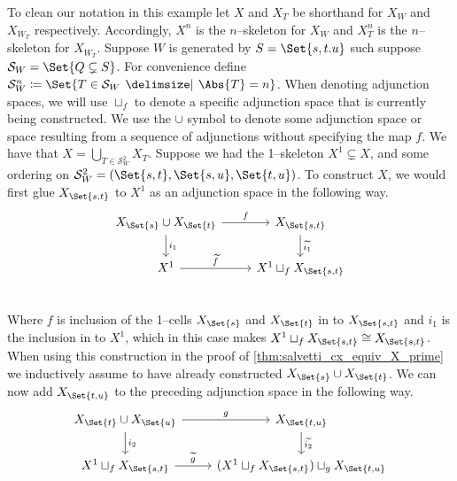 \documentclass[class=article, crop=false]{standalone}
\begin{document}
\begin{example}
    \label{eg:inductive_construction}
    To clean our notation in this example let $X$ and $X_T$ be shorthand for $X_W$ and $X_{W_T}$ respectively. Accordingly, $X^n$ is the $n$--skeleton for $X_W$ and $X_T^n$ is the $n$--skeleton for $X_{W_T}$.
    Suppose $W$ is generated by $S = \Set{s,t.u}$ such suppose $\mathcal{S}_W  = \Set{Q \subsetneq S}$. For convenience define $\mathcal{S}_W^n \coloneq \Set{T \in \mathcal{S}_W \given \Abs{T} = n }$. When denoting adjunction spaces, we will use $\sqcup_f$ to denote a specific adjunction space that is currently being constructed. We use the $\cup$ symbol to denote some adjunction space or space resulting from a sequence of adjunctions without specifying the map $f$. We have that $X = \bigcup_{T \in \mathcal{S}_W^2} X_T$. Suppose we had the 1--skeleton $X^1 \subsetneq X$, and some ordering on $\mathcal{S}_W^2 = (\Set{s,t}, \Set{s,u}, \Set{t,u})$. To construct $X$, we would first glue $X_{\Set{s,t}}$ to $X^1$ as an adjunction space in the following way.
    \begin{equation}
        \begin{tikzcd}
                X_{{\Set{s}}} \cup X_{{\Set{t}}} \ar[r, "f" ] \ar[d, "i_1"]   &    X_{{\Set{s,t}}} \ar[d, "\widetilde{i_1}"]    \\
                X^1 \ar[r, "\widetilde{f}"]                                 &   X^1 \sqcup_f X_{{\Set{s,t}}}            \\
        \end{tikzcd}
        \label{eqn:inductive_gluing_step_1}
    \end{equation}
    Where $f$ is inclusion of the 1--cells $X_{{\Set{s}}}$ and $X_{{\Set{t}}}$ in to $X_{\Set{s,t}}$ and $i_1$ is the inclusion in to $X^1$, which in this case makes $X^1 \sqcup_f X_{{\Set{s,t}}} \cong X_{{\Set{s,t}}}$. When using this construction in the proof of \cref{thm:salvetti_cx_equiv_X_prime} we inductively assume to have already constructed $ X_{{\Set{s}}} \cup X_{{\Set{t}}}$.
    We can now add $X_{\Set{t,u}}$ to the preceding adjunction space in the following way.
    \begin{equation}
        \begin{tikzcd}
                X_{{\Set{t}}} \cup X_{{\Set{u}}} \ar[r, "g" ] \ar[d, "i_2"]   &  X_{{\Set{t,u}}}   \ar[d, "\widetilde{i_2}"]    \\
                X^1 \sqcup_f X_{{\Set{s,t}}} \ar[r, "\widetilde{g}"]            &   (X^1 \sqcup_f X_{{\Set{s,t}}}) \sqcup_g X_{{\Set{t,u}}}            \\

\end{tikzcd}
\end{equation}
\end{example}
\end{document}
